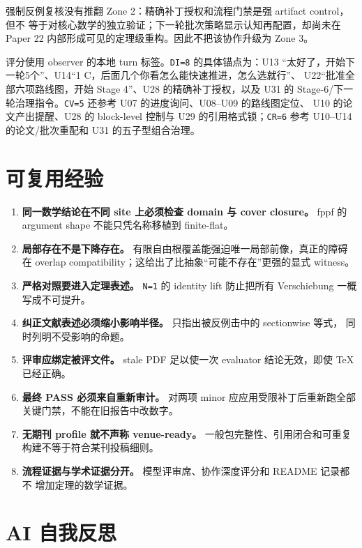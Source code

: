 \documentclass[12pt,a4paper]{article}
\providecommand{\tightlist}{\setlength{\itemsep}{0pt}\setlength{\parskip}{0pt}}
\begin{document}
强制反例复核没有推翻 Zone 2：精确补丁授权和流程门禁是强 artifact
control，但不
等于对核心数学的独立验证；下一轮批次策略显示认知再配置，却尚未在 Paper
22 内部形成可见的定理级重构。因此不把该协作升级为 Zone 3。

评分使用 observer 的本地 turn 标签。\texttt{DI=8} 的具体锚点为：U13
``太好了，开始下一轮5个''、U14``1
C，后面几个你看怎么能快速推进，怎么选就行''、
U22``批准全部六项路线图，开始 Stage 4''、U28 的精确补丁授权，以及 U31 的
Stage-6/下一轮治理指令。\texttt{CV=5} 还参考 U07 的进度询问、U08--U09
的路线图定位、 U10 的论文产出提醒、U28 的 block-level 控制与 U29
的引用格式锁；\texttt{CR=6} 参考 U10--U14 的论文/批次重配和 U31
的五子型组合治理。

\hypertarget{ux53efux590dux7528ux7ecfux9a8c}{%
\section{可复用经验}\label{ux53efux590dux7528ux7ecfux9a8c}}

\begin{enumerate}
\def\labelenumi{\arabic{enumi}.}
\tightlist
\item
  \textbf{同一数学结论在不同 site 上必须检查 domain 与 cover closure。}
  fppf 的 argument shape 不能只凭名称移植到 finite-flat。
\item
  \textbf{局部存在不是下降存在。}
  有限自由根覆盖能强迫唯一局部前像，真正的障碍在 overlap
  compatibility；这给出了比抽象``可能不存在''更强的显式 witness。
\item
  \textbf{严格对照要进入定理表述。} \texttt{N=1} 的 identity lift
  防止把所有 Verschiebung 一概写成不可提升。
\item
  \textbf{纠正文献表述必须缩小影响半径。} 只指出被反例击中的 sectionwise
  等式， 同时列明不受影响的命题。
\item
  \textbf{评审应绑定被评文件。} stale PDF 足以使一次 evaluator
  结论无效，即使 TeX 已经正确。
\item
  \textbf{最终 PASS 必须来自重新审计。} 对两项 minor
  应应用受限补丁后重新跑全部 关键门禁，不能在旧报告中改数字。
\item
  \textbf{无期刊 profile 就不声称 venue-ready。}
  一般包完整性、引用闭合和可重复 构建不等于符合某刊投稿细则。
\item
  \textbf{流程证据与学术证据分开。} 模型评审席、协作深度评分和 README
  记录都不 增加定理的数学证据。
\end{enumerate}

\hypertarget{ai-ux81eaux6211ux53cdux601d}{%
\section{AI 自我反思}\label{ai-ux81eaux6211ux53cdux601d}}
\end{document}
